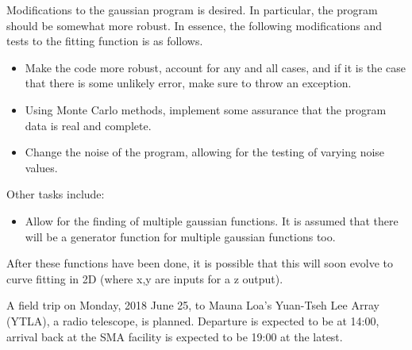 \documentclass[twocolumn]{article}
\begin{document}
\begin{meetingnotes*}
	Modifications to the gaussian program is desired. In particular, the program should be somewhat more robust. In essence, the following modifications and tests to the fitting function is as follows.

	\begin{itemize}
		\item Make the code more robust, account for any and all cases, and if it is the case that there is some unlikely error, make sure to throw an exception.
		\item Using Monte Carlo methods, implement some assurance that the program data is real and complete.
		\item Change the noise of the program, allowing for the testing of varying noise values.
	\end{itemize}


	Other tasks include:
	\begin{itemize}
		\item Allow for the finding of multiple gaussian functions. It is assumed that there will be a generator function for multiple gaussian functions too.
	\end{itemize}
	After these functions have been done, it is possible that this will soon evolve to curve fitting in 2D (where x,y are inputs for a z output).
\end{meetingnotes*}

A field trip on Monday, 2018 June 25, to Mauna Loa's Yuan-Tseh Lee Array (YTLA), a radio telescope, is planned. Departure is expected to be at 14:00, arrival back at the SMA facility is expected to be 19:00 at the latest. 
\end{document}

